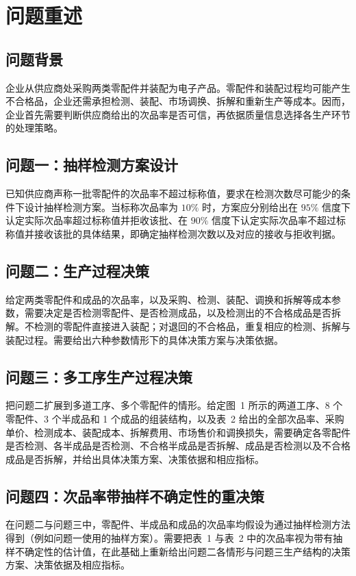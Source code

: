 \section{问题重述}

\subsection{问题背景}

企业从供应商处采购两类零配件并装配为电子产品。零配件和装配过程均可能产生不合格品，企业还需承担检测、装配、市场调换、拆解和重新生产等成本。因而，企业首先需要判断供应商给出的次品率是否可信，再依据质量信息选择各生产环节的处理策略。

\subsection{问题一：抽样检测方案设计}

已知供应商声称一批零配件的次品率不超过标称值，要求在检测次数尽可能少的条件下设计抽样检测方案。当标称次品率为 $10\%$ 时，方案应分别给出在 $95\%$ 信度下认定实际次品率超过标称值并拒收该批、在 $90\%$ 信度下认定实际次品率不超过标称值并接收该批的具体结果，即确定抽样检测次数以及对应的接收与拒收判据。

\subsection{问题二：生产过程决策}

给定两类零配件和成品的次品率，以及采购、检测、装配、调换和拆解等成本参数，需要决定是否检测零配件、是否检测成品，以及检测出的不合格成品是否拆解。不检测的零配件直接进入装配；对退回的不合格品，重复相应的检测、拆解与装配过程。需要给出六种参数情形下的具体决策方案与决策依据。

\subsection{问题三：多工序生产过程决策}

把问题二扩展到多道工序、多个零配件的情形。给定图~1 所示的两道工序、8 个零配件、3 个半成品和 1 个成品的组装结构，以及表~2 给出的全部次品率、采购单价、检测成本、装配成本、拆解费用、市场售价和调换损失，需要确定各零配件是否检测、各半成品是否检测、不合格半成品是否拆解、成品是否检测以及不合格成品是否拆解，并给出具体决策方案、决策依据和相应指标。

\subsection{问题四：次品率带抽样不确定性的重决策}

在问题二与问题三中，零配件、半成品和成品的次品率均假设为通过抽样检测方法得到（例如问题一使用的抽样方案）。需要把表~1 与表~2 中的次品率视为带有抽样不确定性的估计值，在此基础上重新给出问题二各情形与问题三生产结构的决策方案、决策依据及相应指标。
